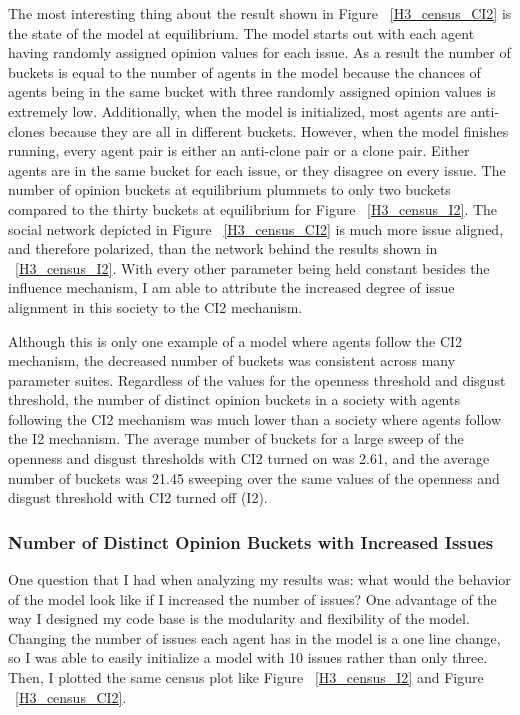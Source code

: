 The most interesting thing about the result shown in Figure ~\ref{H3_census_CI2} is the state of the model at equilibrium. The model starts out with each agent having randomly assigned opinion values for each issue. As a result the number of buckets is equal to the number of agents in the model because the chances of agents being in the same bucket with three randomly assigned opinion values is extremely low. Additionally, when the model is initialized, most agents are anti-clones because they are all in different buckets. However, when the model finishes running, every agent pair is either an anti-clone pair or a clone pair. Either agents are in the same bucket for each issue, or they disagree on every issue. The number of opinion buckets at equilibrium plummets to only two buckets compared to the thirty buckets at equilibrium for Figure ~\ref{H3_census_I2}. The social network depicted in Figure ~\ref{H3_census_CI2} is much more issue aligned, and therefore polarized, than the network behind the results shown in ~\ref{H3_census_I2}. With every other parameter being held constant besides the influence mechanism, I am able to attribute the increased degree of issue alignment in this society to the CI2 mechanism. 

Although this is only one example of a model where agents follow the CI2 mechanism, the decreased number of buckets was consistent across many parameter suites. Regardless of the values for the openness threshold and disgust threshold, the number of distinct opinion buckets in a society with agents following the CI2 mechanism was much lower than a society where agents follow the I2 mechanism. The average number of buckets for a large sweep of the openness and disgust thresholds with CI2 turned on was 2.61, and the average number of buckets was 21.45 sweeping over the same values of the openness and disgust threshold with CI2 turned off (I2).         

\subsubsection{Number of Distinct Opinion Buckets with Increased Issues}

One question that I had when analyzing my results was: what would the behavior of the model look like if I increased the number of issues? One advantage of the way I designed my code base is the modularity and flexibility of the model. Changing the number of issues each agent has in the model is a one line change, so I was able to easily initialize a model with 10 issues rather than only three. Then, I plotted the same census plot like Figure ~\ref{H3_census_I2} and Figure ~\ref{H3_census_CI2}. 

